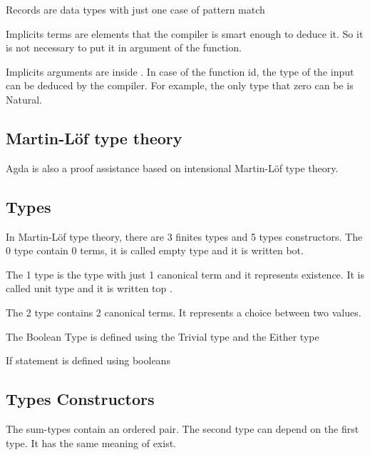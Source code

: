 \documentclass[12pt]{article}
\begin{document}
  Records are data types with just one case of pattern match


  Implicits terms are elements that the compiler is smart enough to deduce it.
  So it is not necessary to put it in argument of the function.


  Implicits arguments are inside {}.
  In case of the function id, the type of the input can be deduced by the compiler.
  For example, the only type that zero can be is Natural.


  \subsection{Martin-Löf type theory}
  Agda is also a proof assistance based on intensional Martin-Löf type theory.

    \subsection{Types}
    In Martin-Löf type theory, there are 3 finites types and 5 types constructors.
    The 0 type contain 0 terms, it is called empty type and it is written bot.

    The 1 type is the type with just 1 canonical term and it represents existence.
    It is called unit type and it is written top .

    The 2 type contains 2 canonical terms. It represents a choice between two values.

    The Boolean Type is defined using the Trivial type and the Either type

    If statement is defined using booleans


    \subsection{Types Constructors}
    The sum-types contain an ordered pair.
    The second type can depend on the first type.
    It has the same meaning of exist.
\end{document}
